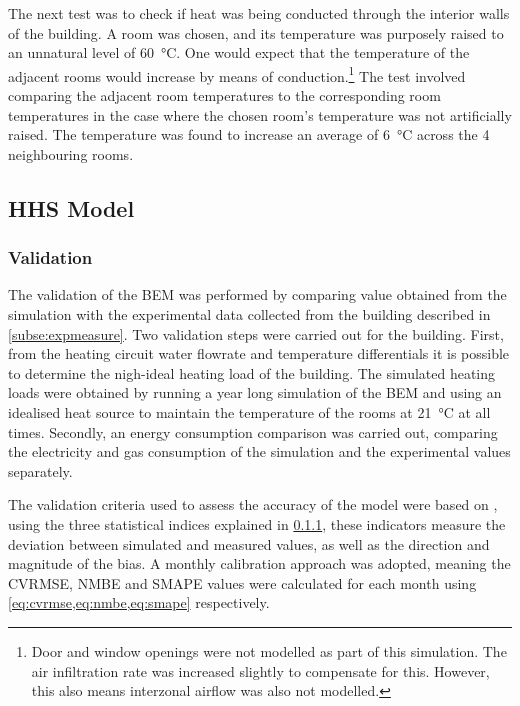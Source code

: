 The next test was to check if heat was being conducted through the interior walls of the building. A room was chosen, and its temperature was purposely raised to an unnatural level of \qty{60}{\celsius}. One would expect that the temperature of the adjacent rooms would increase by means of conduction.\footnote{Door and window openings were not modelled as part of this simulation. The air infiltration rate was increased slightly to compensate for this. However, this also means interzonal airflow was also not modelled.} The test involved comparing the adjacent room temperatures to the corresponding room temperatures in the case where the chosen room's temperature was not artificially raised. The temperature was found to increase an average of \qty{6}{\celsius} across the 4 neighbouring rooms. 
\subsection{HHS Model}\label{sec:methodheatingsys}
\subsubsection{Validation} \label{subsubsec:validation}
The validation of the \ac{BEM} was performed by comparing value obtained from the simulation with the experimental data collected from the building described in \cref{subse:expmeasure}. Two validation steps were carried out for the building. First, from the heating circuit water flowrate and temperature differentials it is possible to determine the nigh-ideal heating load of the building. The simulated heating loads were obtained by running a year long simulation of the \ac{BEM} and using an idealised heat source to maintain the temperature of the rooms at \qty{21}{\celsius} at all times. Secondly, an energy consumption comparison was carried out, comparing the electricity and gas consumption of the simulation and the experimental values separately. 

The validation criteria used to assess the accuracy of the model were based on   \cite{ashrae_guideline_project_committee_14_ashrae_2014}, using the three statistical indices explained in \cref{subsubsec:validation}, these indicators measure the deviation between simulated and measured values, as well as the direction and magnitude of the bias. A monthly calibration approach was adopted, meaning the \ac{CVRMSE}, \ac{NMBE} and \ac{SMAPE} values were calculated for each month using \cref{eq:cvrmse,eq:nmbe,eq:smape} respectively. 

